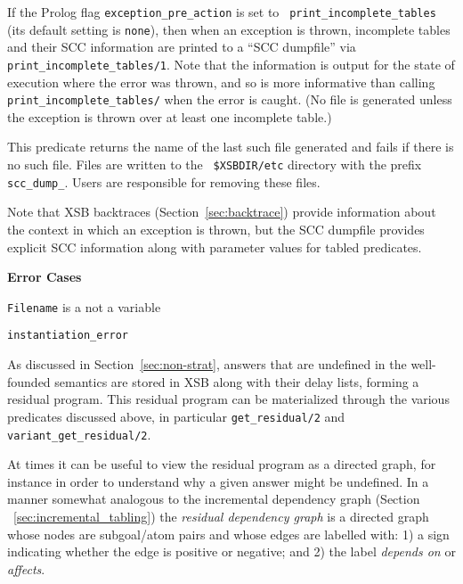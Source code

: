 \begin{description}
%
If the Prolog flag {\tt exception\_pre\_action} is set to {\tt
  print\_incomplete\_tables} (its default setting is {\tt none}), then
when an exception is thrown, incomplete tables and their SCC
information are printed to a ``SCC dumpfile'' via {\tt
  print\_incomplete\_tables/1}.  Note that the information is output
for the state of execution where the error was thrown, and so is more
informative than calling {\tt print\_incomplete\_tables/} when the
error is caught.  (No file is generated unless the exception is thrown
over at least one incomplete table.)

This predicate returns the name of the last such file generated and
fails if there is no such file.  Files are written to the {\tt
  \$XSBDIR/etc} directory with the prefix {\tt scc\_dump\_}.  Users
are responsible for removing these files.

Note that XSB backtraces (Section~\ref{sec:backtrace}) provide
information about the context in which an exception is thrown, but the
SCC dumpfile provides explicit SCC information along with parameter
values for tabled predicates.

{\bf Error Cases}
\bi
\item {\tt Filename} is a not a variable
\bi
\item {\tt instantiation\_error}
\ei
\ei

%
As discussed in Section~\ref{sec:non-strat}, answers that are
undefined in the well-founded semantics are stored in XSB along with
their delay lists, forming a residual program.  This residual program
can be materialized through the various predicates discussed above, in
particular {\tt get\_residual/2} and {\tt variant\_get\_residual/2}.

At times it can be useful to view the residual program as a directed
graph, for instance in order to understand why a given answer might be
undefined.  In a manner somewhat analogous to the incremental
dependency graph (Section ~\ref{sec:incremental_tabling}) the {\em
  residual dependency graph} is a directed graph whose nodes are
subgoal/atom pairs and whose edges are labelled with: 1) a sign
indicating whether the edge is positive or negative; and 2) the label
{\em depends on} or {\em affects}.


\end{description}
